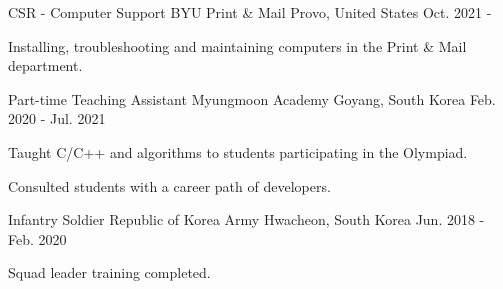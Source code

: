 

\begin{cventries}

  \cventry
  {CSR - Computer Support} %
  {BYU Print \& Mail} %
  {Provo, United States} %
  {Oct. 2021 - } %
  {
    \begin{cvitems} %
      \item {Installing, troubleshooting and maintaining computers in the Print \& Mail department.}
    \end{cvitems}
  }

  \cventry
  {Part-time Teaching Assistant} %
  {Myungmoon Academy} %
  {Goyang, South Korea} %
  {Feb. 2020 - Jul. 2021} %
  {
    \begin{cvitems} %
      \item {Taught C/C++ and algorithms to students participating in the Olympiad.}
      \item {Consulted students with a career path of developers.}
    \end{cvitems}
  }

  \cventry
  {Infantry Soldier} %
  {Republic of Korea Army} %
  {Hwacheon, South Korea} %
  {Jun. 2018 - Feb. 2020} %
  {
    \begin{cvitems} %
      \item {Squad leader training completed.}
    \end{cvitems}
  }

\end{cventries}
